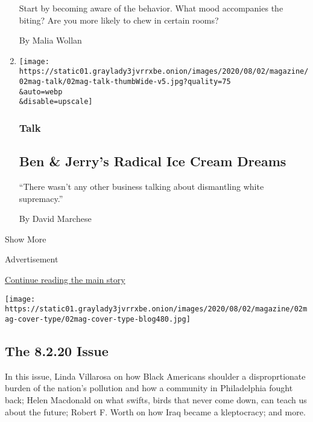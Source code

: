 \begin{enumerate}
  Start by becoming aware of the behavior. What mood accompanies the
  biting? Are you more likely to chew in certain rooms?

  By Malia Wollan
\item
  \href{/interactive/2020/07/27/magazine/ben-jerry-interview.html}{}

  \texttt{[image: https://static01.graylady3jvrrxbe.onion/images/2020/08/02/magazine/02mag-talk/02mag-talk-thumbWide-v5.jpg?quality=75\\\&auto=webp\\\&disable=upscale]}

  \hypertarget{talk-1}{%
  \subsubsection{Talk}\label{talk-1}}

  \hypertarget{ben--jerrys-radical-ice-cream-dreams}{%
  \subsection{Ben \& Jerry's Radical Ice Cream
  Dreams}\label{ben--jerrys-radical-ice-cream-dreams}}

  ``There wasn't any other business talking about dismantling white
  supremacy.''

  By David Marchese
\end{enumerate}

Show More

Advertisement

\protect\hyperlink{after-mid2}{Continue reading the main story}

\href{https://www.nytimes3xbfgragh.onion/issue/magazine/2020/07/31/the-8220-issue}{}

\texttt{[image: https://static01.graylady3jvrrxbe.onion/images/2020/08/02/magazine/02mag-cover-type/02mag-cover-type-blog480.jpg]}

\href{https://www.nytimes3xbfgragh.onion/issue/magazine/2020/07/31/the-8220-issue}{}

\hypertarget{the-8220-issue}{%
\subsection{The 8.2.20 Issue}\label{the-8220-issue}}

In this issue, Linda Villarosa on how Black Americans shoulder a
disproprtionate burden of the nation's pollution and how a community in
Philadelphia fought back; Helen Macdonald on what swifts, birds that
never come down, can teach us about the future; Robert F. Worth on how
Iraq became a kleptocracy; and more.

